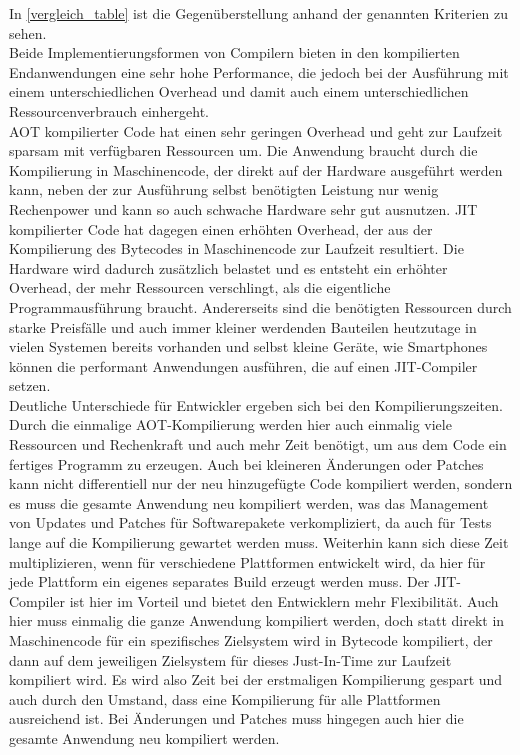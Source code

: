 In \autoref{vergleich_table} ist die Gegenüberstellung anhand der genannten Kriterien zu sehen. \\
Beide Implementierungsformen von Compilern bieten in den kompilierten Endanwendungen eine sehr hohe Performance, die jedoch bei der Ausführung mit einem unterschiedlichen Overhead und damit auch einem unterschiedlichen Ressourcenverbrauch einhergeht. \\
\ac{AOT} kompilierter Code hat einen sehr geringen Overhead und geht zur Laufzeit sparsam mit verfügbaren Ressourcen um. Die Anwendung braucht durch die Kompilierung in Maschinencode, der direkt auf der Hardware ausgeführt werden kann, neben der zur Ausführung selbst benötigten Leistung nur wenig Rechenpower und kann so auch schwache Hardware sehr gut ausnutzen. 
\ac{JIT} kompilierter Code hat dagegen einen erhöhten Overhead, der aus der Kompilierung des Bytecodes in Maschinencode zur Laufzeit resultiert. Die Hardware wird dadurch zusätzlich belastet und es entsteht ein erhöhter Overhead, der mehr Ressourcen verschlingt, als die eigentliche Programmausführung braucht. Andererseits sind die benötigten Ressourcen durch starke Preisfälle und auch immer kleiner werdenden Bauteilen heutzutage in vielen Systemen bereits vorhanden und selbst kleine Geräte, wie Smartphones können die performant Anwendungen ausführen, die auf einen \ac{JIT}-Compiler setzen. \\
Deutliche Unterschiede für Entwickler ergeben sich bei den Kompilierungszeiten. 
Durch die einmalige \ac{AOT}-Kompilierung werden hier auch einmalig viele Ressourcen und Rechenkraft und auch mehr Zeit benötigt, um aus dem Code ein fertiges Programm zu erzeugen. Auch bei kleineren Änderungen oder Patches kann nicht differentiell nur der neu hinzugefügte Code kompiliert werden, sondern es muss die gesamte Anwendung neu kompiliert werden, was das Management von Updates und Patches für Softwarepakete verkompliziert, da auch für Tests lange auf die Kompilierung gewartet werden muss. Weiterhin kann sich diese Zeit multiplizieren, wenn für verschiedene Plattformen entwickelt wird, da hier für jede Plattform ein eigenes separates Build erzeugt werden muss. 
Der \ac{JIT}-Compiler ist hier im Vorteil und bietet den Entwicklern mehr Flexibilität. Auch hier muss einmalig die ganze Anwendung kompiliert werden, doch statt direkt in Maschinencode für ein spezifisches Zielsystem wird in Bytecode kompiliert, der dann auf dem jeweiligen Zielsystem für dieses Just-In-Time zur Laufzeit kompiliert wird. Es wird also Zeit bei der erstmaligen Kompilierung gespart und auch durch den Umstand, dass eine Kompilierung für alle Plattformen ausreichend ist. Bei Änderungen und Patches muss hingegen auch hier die gesamte Anwendung neu kompiliert werden.\\
